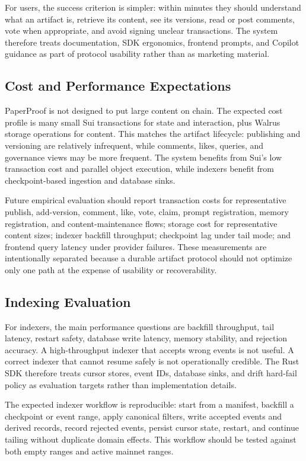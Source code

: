 \documentclass[journal]{IEEEtran}
\begin{document}
For users, the success criterion is simpler: within minutes they should understand what an artifact is, retrieve its content, see its versions, read or post comments, vote when appropriate, and avoid signing unclear transactions. The system therefore treats documentation, SDK ergonomics, frontend prompts, and Copilot guidance as part of protocol usability rather than as marketing material.

\subsection{Cost and Performance Expectations}

PaperProof is not designed to put large content on chain. The expected cost profile is many small Sui transactions for state and interaction, plus Walrus storage operations for content. This matches the artifact lifecycle: publishing and versioning are relatively infrequent, while comments, likes, queries, and governance views may be more frequent. The system benefits from Sui's low transaction cost and parallel object execution, while indexers benefit from checkpoint-based ingestion and database sinks.

Future empirical evaluation should report transaction costs for representative publish, add-version, comment, like, vote, claim, prompt registration, memory registration, and content-maintenance flows; storage cost for representative content sizes; indexer backfill throughput; checkpoint lag under tail mode; and frontend query latency under provider failures. These measurements are intentionally separated because a durable artifact protocol should not optimize only one path at the expense of usability or recoverability.

\subsection{Indexing Evaluation}

For indexers, the main performance questions are backfill throughput, tail latency, restart safety, database write latency, memory stability, and rejection accuracy. A high-throughput indexer that accepts wrong events is not useful. A correct indexer that cannot resume safely is not operationally credible. The Rust SDK therefore treats cursor stores, event IDs, database sinks, and drift hard-fail policy as evaluation targets rather than implementation details.

The expected indexer workflow is reproducible: start from a manifest, backfill a checkpoint or event range, apply canonical filters, write accepted events and derived records, record rejected events, persist cursor state, restart, and continue tailing without duplicate domain effects. This workflow should be tested against both empty ranges and active mainnet ranges.
\end{document}
